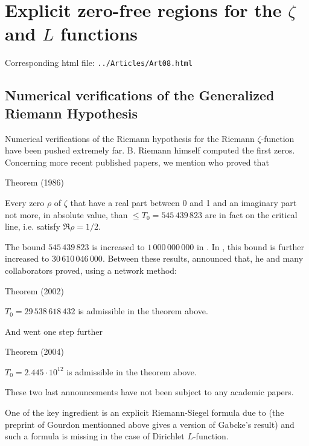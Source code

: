 \chapter{  Explicit zero-free regions for the $\zeta$ and $L$ functions}

Corresponding html file: \texttt{../Articles/Art08.html}









\section{Numerical verifications of the Generalized Riemann Hypothesis}


Numerical verifications of the Riemann hypothesis for the Riemann
$\zeta$-function have been pushed extremely far. B. Riemann himself computed the
first zeros. Concerning more recent published papers, we mention
\cite{Lune-Riele-Winter*86}
who proved that
\begin{thm}{Theorem (1986)}

  Every zero $\rho$ of $\zeta$ that have a real part between 0 and 1 and
  an imaginary part not more, in absolute value, than $\le T_0=545\,439\,823$
  are in fact on the critical line, i.e. satisfy $\Re \rho=1/2$.
\end{thm}

The bound $545\,439\,823$ is increased to $1\,000\,000\,000$ in
\cite{Platt*11}.
In
\cite{Platt*17},
this bound is further increased to
$30\,610\,046\,000$.
Between these results, 
\cite{Wedeniwski*02}
announced that, he and many collaborators proved, using a network method:
\begin{thm}{Theorem (2002)}

  $T_0=29\,538\,618\,432$ is admissible in the theorem above.
\end{thm}

And
\cite{Gourdon-Demichel*04}
went one step further
\par 
\begin{thm}{Theorem (2004)}

  $T_0=2.445\cdot 10^{12}$ is admissible in the theorem above.
\end{thm}

These two last announcements have not been subject to any academic papers.

One of the key ingredient is an explicit Riemann-Siegel formula due to
\cite{Gabcke*79}
(the preprint of Gourdon mentionned above gives a version of Gabcke's result)
and such a formula is missing in the case of Dirichlet $L$-function.

